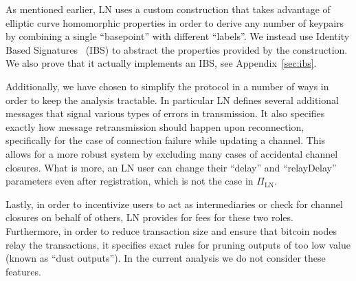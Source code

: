     As mentioned earlier, LN uses a custom construction that takes advantage of
    elliptic curve homomorphic properties in order to derive any number of
    keypairs by combining a single ``basepoint'' with different ``labels''. We
    instead use  Identity Based Signatures~\cite{ibsshamir,ibspaterson} (IBS)
    to abstract the properties provided by the construction.  We also prove that
    it actually implements an IBS, see Appendix~\ref{sec:ibs}.

    Additionally, we have chosen to simplify the protocol in a number of ways in
    order to keep the analysis tractable. In particular LN defines several
    additional messages that signal various types of errors in transmission. It
    also specifies exactly how message retransmission should happen upon
    reconnection, specifically for the case of connection failure while updating
    a channel. This allows for a more robust system by excluding many cases of
    accidental channel closures. What is more, an LN user can change their
    ``delay'' and ``relayDelay'' parameters even after registration, which is
    not the case in $\Pi_{\mathrm{LN}}$.

    Lastly, in order to incentivize users to act as intermediaries or check for
    channel closures on behalf of others, LN provides for fees for these two
    roles. Furthermore, in order to reduce transaction size and ensure that
    bitcoin nodes relay the transactions, it specifies exact rules for pruning
    outputs of too low value (known as ``dust outputs''). In the current
    analysis we do not consider these features.
  \ifelseieee{}{\end{remark}}
